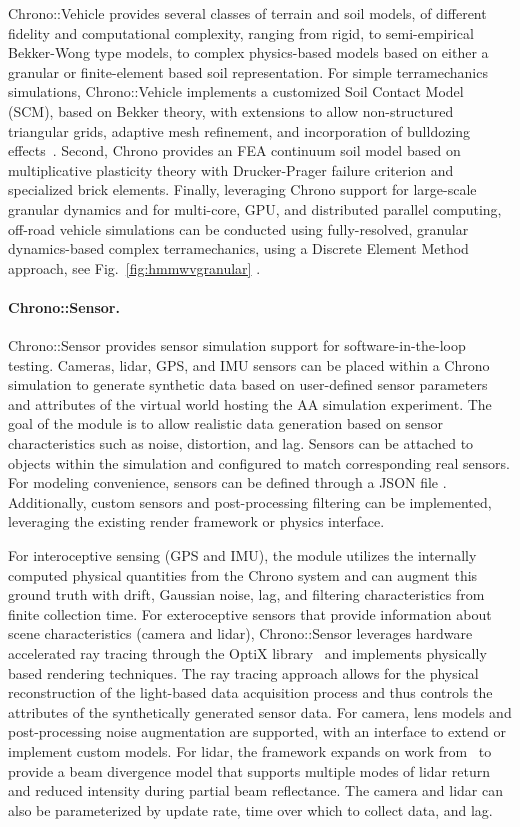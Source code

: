 \documentclass[12pt,twocolumn]{article}
\begin{document}
Chrono::Vehicle provides several classes of terrain and soil models, of different fidelity and computational complexity, ranging from rigid, to semi-empirical Bekker-Wong type models, to complex physics-based models based on either a granular or finite-element based soil representation.  For simple terramechanics simulations, Chrono::Vehicle implements a customized Soil Contact Model (SCM), based on Bekker theory, with extensions to allow non-structured triangular grids, adaptive mesh refinement, and incorporation of bulldozing effects~\cite{ChronoSCM2019}.  Second, Chrono provides an FEA continuum soil model based on multiplicative plasticity theory with Drucker-Prager failure criterion and  specialized brick elements. Finally, leveraging Chrono support for large-scale granular dynamics and for multi-core, GPU, and distributed parallel computing, off-road vehicle simulations can be conducted using fully-resolved, granular dynamics-based complex terramechanics, using a Discrete Element Method approach, see Fig.~\ref{fig:hmmwvgranular} \cite{antonioVehicleTireGranMatSim2017, serbanCosimIJVP2019}.

\paragraph{Chrono::Sensor.} Chrono::Sensor provides sensor simulation support for software-in-the-loop testing. Cameras, lidar, GPS, and IMU sensors can be placed within a Chrono simulation to generate synthetic data based on user-defined sensor parameters and attributes of the virtual world hosting the AA simulation experiment. The goal of the module is to allow realistic data generation based on sensor characteristics such as noise, distortion, and lag. Sensors can be attached to objects within the simulation and configured to match corresponding real sensors. For modeling convenience, sensors can be defined through a JSON file \cite{json}. Additionally, custom sensors and post-processing filtering can be implemented, leveraging the existing render framework or physics interface. 

For interoceptive sensing (GPS and IMU), the module utilizes the internally computed physical quantities from the Chrono system and can augment this ground truth with drift, Gaussian noise, lag, and filtering characteristics from finite collection time. For exteroceptive sensors that provide information about scene characteristics (camera and lidar), Chrono::Sensor leverages hardware accelerated ray tracing through the OptiX library~\cite{optixNVIDIA} and implements physically based rendering techniques. The ray tracing approach allows for the physical reconstruction of the light-based data acquisition process and thus controls the attributes of the synthetically generated sensor data. For camera, lens models and post-processing noise augmentation are supported, with an interface to extend or implement custom models. For lidar, the framework expands on work from~\cite{goodin2018enabling} to provide a beam divergence model that supports multiple modes of lidar return and reduced intensity during partial beam reflectance. The camera and lidar can also be parameterized by update rate, time over which to collect data, and lag. 
\end{document}
